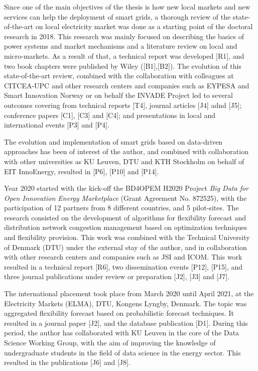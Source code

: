 Since one of the main objectives of the thesis is how new local markets and new services can help the deployment of smart grids, a thorough review of the state-of-the-art on local electricity market was done as a starting point of the doctoral research in 2018. This research was mainly focused on describing the basics of power systems and market mechanisms and a literature review on local and micro-markets. As a result of that, a technical report was developed [R1], and two book chapters were published by Wiley ([B1],[B2]).  The evolution of this state-of-the-art review, combined with the collaboration with colleagues at CITCEA-UPC and other research centers and companies such as EYPESA and Smart Innovation Norway or on behalf the INVADE Project led to several outcomes covering from technical reports [T4], journal articles [J4] adnd [J5]; conference papers [C1], [C3] and [C4]; and presentations in local and international events [P3] and [P4].  

The evolution and implementation of smart grids based on data-driven approaches has been of interest of the author, and combined with collaboration with other universities as KU Leuven, DTU and KTH Stockholm on behalf of EIT InnoEnergy, resulted in [P6], [P10] and [P14]. 

Year 2020 started with the kick-off the BD4OPEM H2020 Project \textit{Big Data for Open Innovation Energy Marketplace} (Grant Agreement No. 872525), with the participation of 12 partners from 8 different countries, and 5 pilot-sites. The research consisted on the development of algorithms for flexibility forecast and distribution network congestion management based on optimization techniques and flexibility provision. This work was combined with the Technical University of Denmark (DTU) under the external stay of the author, and in collaboration with other research centers and companies such as JSI and ICOM. This work resulted in a technical report [R6], two dissemination events [P12], [P15], and three journal publications under review or preparation [J2], [J3] and [J7].  

The international placement took place from March 2020 until April 2021, at the Electricity Markets (ELMA), DTU, Kongens Lyngby, Denmark. The topic was aggregated flexibility forecast based on probabilistic forecast techniques. It resulted in a journal paper [J2], and the database publication [D1]. During this period, the author has collaborated with KU Leuven in the core of the Data Science Working Group, with the aim of improving the knowledge of undergraduate students in the field of data science in the energy sector. This resulted in the publications [J6] and [J8]. 

